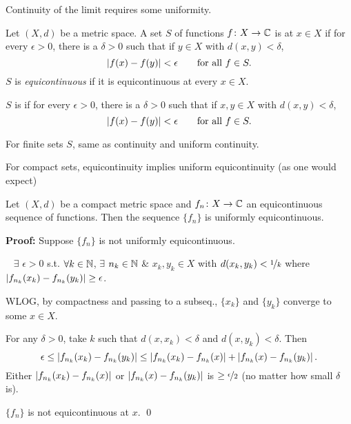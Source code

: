 \documentclass[10pt,aspectratio=169]{beamer}
\begin{document}
\begin{frame}
Continuity of the limit requires some uniformity.
\pause

\begin{definition}
Let $(X,d)$ be a metric space.
A set $S$ of functions
$f \colon X \to {\mathbb{C}}$ is
\emph{} at $x \in X$
if for every $\epsilon > 0$, there is a $\delta > 0$
such that if $y \in X$ with $d(x,y) < \delta$,
\begin{equation*}
\lvert {f(x)-f(y)} \rvert < \epsilon \qquad \text{for all } f \in S .
\end{equation*}
$S$ is \emph{equicontinuous} if it is equicontinuous at every $x \in X$.

\pause
\medskip

$S$ is 
\emph{}
if for every $\epsilon > 0$, there is a $\delta > 0$
such that if $x,y \in X$ with $d(x,y) < \delta$,
\begin{equation*}
\lvert {f(x)-f(y)} \rvert < \epsilon \qquad \text{for all } f \in S .
\end{equation*}
\end{definition}

\medskip
\pause

For finite sets $S$, same as continuity and uniform continuity.
\end{frame}

\begin{frame}

For compact sets, equicontinuity implies uniform equicontinuity (as one
would expect)
\pause

\begin{proposition}
Let $(X,d)$ be a compact metric space and
$f_n \colon X \to {\mathbb{C}}$ an equicontinuous sequence of functions.
Then the sequence $\{ f_n \}$ is uniformly equicontinuous.
\end{proposition}

\pause
\textbf{Proof:}
Suppose $\{ f_n \}$ is not
uniformly equicontinuous.
\pause

\thus~
$\exists$
$\epsilon > 0$
s.t. $\forall k \in {\mathbb{N}}$,
$\exists$
$n_k \in {\mathbb{N}}$ \&
$x_k,y_k \in X$ with $d(x_k,y_k) < \nicefrac{1}{k}$
where $\lvert {f_{n_k}(x_k)-f_{n_k}(y_k)} \rvert \geq \epsilon$.

\medskip
\pause

WLOG, by compactness and passing to a subseq., $\{x_k\}$ and $\{ y_k\}$ converge
to some $x \in X$.

\medskip
\pause

For any $\delta > 0$, take $k$ such that
$d(x,x_k) < \delta$ and
$d(x,y_k) < \delta$.
\pause Then
\begin{equation*}
\epsilon \leq 
\left\lvert {f_{n_k}(x_k)-f_{n_k}(y_k)} \right\rvert
\leq
\left\lvert {f_{n_k}(x_k)-f_{n_k}(x)} \right\rvert + \left\lvert {f_{n_k}(x)-f_{n_k}(y_k)} \right\rvert .
\end{equation*}
\pause
\thus \quad
Either 
$\left\lvert {f_{n_k}(x_k)-f_{n_k}(x)} \right\rvert$ or $\left\lvert {f_{n_k}(x)-f_{n_k}(y_k)} \right\rvert$ is
$\geq \nicefrac{\epsilon}{2}$ (no matter how small $\delta$ is).

\medskip
\pause
\thus\quad $\{ f_n \}$ is not equicontinuous at $x$. \qed
\end{frame}
\end{document}

